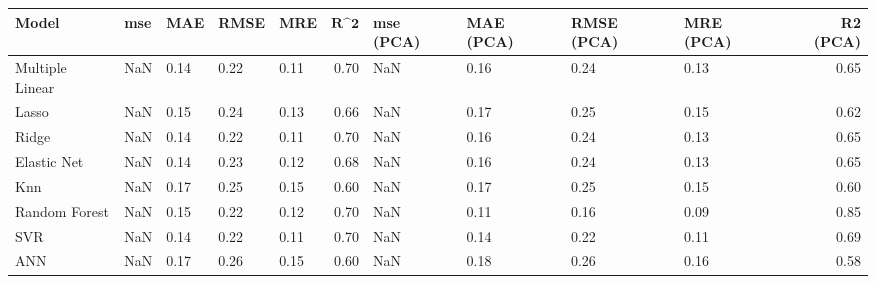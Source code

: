 \begin{table}
\centering
\label{table:iri_reg_pred}
\begin{tabular}{lllllrllllr}
\toprule
 \textbf{Model} & \textbf{mse} & \textbf{MAE} & \textbf{RMSE} & \textbf{MRE} & $\textbf{R^2}$ & \textbf{mse (PCA)} & \textbf{MAE (PCA)} & \textbf{RMSE (PCA)} & \textbf{MRE (PCA)} & \textbf{R2 (PCA)} \\
\midrule
Multiple Linear &          NaN &         0.14 &          0.22 &         0.11 &           0.70 &                NaN &               0.16 &                0.24 &               0.13 &              0.65 \\
          Lasso &          NaN &         0.15 &          0.24 &         0.13 &           0.66 &                NaN &               0.17 &                0.25 &               0.15 &              0.62 \\
          Ridge &          NaN &         0.14 &          0.22 &         0.11 &           0.70 &                NaN &               0.16 &                0.24 &               0.13 &              0.65 \\
    Elastic Net &          NaN &         0.14 &          0.23 &         0.12 &           0.68 &                NaN &               0.16 &                0.24 &               0.13 &              0.65 \\
            Knn &          NaN &         0.17 &          0.25 &         0.15 &           0.60 &                NaN &               0.17 &                0.25 &               0.15 &              0.60 \\
  Random Forest &          NaN &         0.15 &          0.22 &         0.12 &           0.70 &                NaN &               0.11 &                0.16 &               0.09 &              0.85 \\
            SVR &          NaN &         0.14 &          0.22 &         0.11 &           0.70 &                NaN &               0.14 &                0.22 &               0.11 &              0.69 \\
            ANN &          NaN &         0.17 &          0.26 &         0.15 &           0.60 &                NaN &               0.18 &                0.26 &               0.16 &              0.58 \\
\bottomrule
\end{tabular}
\end{table}
